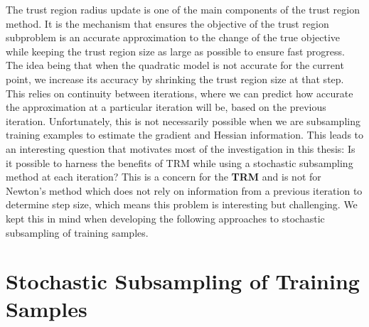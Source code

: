\documentclass[letterpaper,12pt,titlepage,oneside,final]{book}
\begin{document}
	The trust region radius update is one of the main components of the trust region method. It is the mechanism that ensures the objective of the trust region subproblem is an accurate approximation to the change of the true objective while keeping the trust region size as large as possible to ensure fast progress. The idea being that when the quadratic model is not accurate for the current point, we increase its accuracy by shrinking the trust region size at that step. This relies on continuity between iterations, where we can predict how accurate the approximation at a particular iteration will be, based on the previous iteration. Unfortunately, this is not necessarily possible when we are subsampling training examples to estimate the gradient and Hessian information. This leads to an interesting question that motivates most of the investigation in this thesis: Is it possible to harness the benefits of TRM while using a stochastic subsampling method at each iteration? This is a concern for the \textbf{TRM} and is not for Newton's method which does not rely on information from a previous iteration to determine step size, which means this problem is interesting but challenging. We kept this in mind when developing the following approaches to stochastic subsampling of training samples.
	
	\section{Stochastic Subsampling of Training Samples}
	
\end{document}
